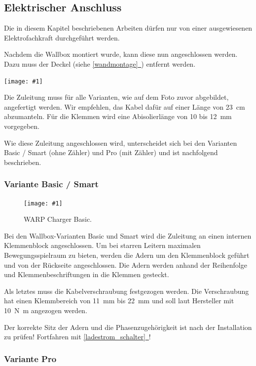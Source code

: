 \documentclass[a4paper,10pt]{article}
\newcommand{\hint}[1]{\begin{tcolorbox}[colback=boxgray,colframe=black,coltext=
white,title=Hinweis]#1\end{tcolorbox}}
\newcommand{\gfx}[1]{\texttt{[image: \#1]}}
\newcommand*{\fullref}[1]{\hyperref[{#1}]{\ref*{#1}~\nameref*{#1}}}
\begin{document}
\begin{multicols*}{2}
	\newpage
	\subsection{Elektrischer Anschluss}
	\hint{Die in diesem Kapitel beschriebenen Arbeiten dürfen nur von einer ausgewiesenen
		Elektrofachkraft durchgeführt werden.}

	Nachdem die Wallbox montiert wurde, kann diese nun angeschlossen werden. Dazu
	muss der Deckel (siehe \fullref{wandmontage}) entfernt werden.

	\gfx{./img_warp2/resized/warp_cable_cut_ready}

	Die Zuleitung muss für alle Varianten, wie auf dem Foto zuvor abgebildet,
	angefertigt werden. Wir empfehlen, das Kabel dafür auf einer Länge von
	\SI{23}{\centi\meter} abzumanteln. Für die Klemmen wird eine
	Abisolierlänge von 10 bis \SI{12}{\milli\meter} vorgegeben.

	Wie diese Zuleitung angeschlossen wird, unterscheidet sich bei 
	den Varianten Basic / Smart (ohne Zähler) und Pro (mit Zähler) und ist
	nachfolgend beschrieben.

	\subsubsection{Variante Basic / Smart}

	\begin{figure}[H]
		\gfx{./img_warp2/resized/warp2_basic_top_open}
		\caption*{WARP Charger Basic.}
	\end{figure}

	Bei den Wallbox-Varianten Basic und Smart
	wird die Zuleitung an einen internen Klemmenblock
	angeschlossen. Um bei starren Leitern maximalen Bewegungsspielraum zu bieten,
	werden die Adern um den Klemmenblock geführt und von der Rückseite
	angeschlossen. Die Adern werden anhand der Reihenfolge und Klemmenbeschriftungen in die
	Klemmen gesteckt.

	Als letztes muss die Kabelverschraubung festgezogen werden. Die Verschraubung
	hat einen Klemmbereich von \SI{11}{\milli\meter} bis \SI{22}{\milli\meter} und soll laut Hersteller mit
	\SI{10}{\newton\meter} angezogen werden.

	Der korrekte Sitz der Adern und die Phasenzugehörigkeit ist nach der
	Installation zu prüfen! Fortfahren mit \fullref{ladestrom_schalter}!


	\subsubsection{Variante Pro}


\end{multicols*}
\end{document}
